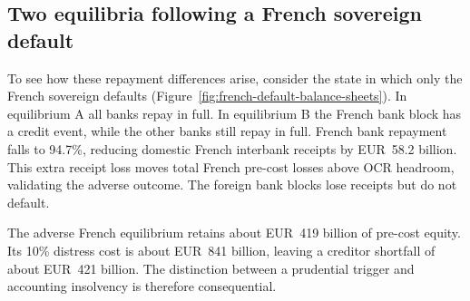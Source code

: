 \documentclass[preprint,12pt,authoryear]{elsarticle}
\begin{document}
\begin{table}[htbp]
\centering
{}
\label{tab:bank-recovery-dispersion}


\par\smallskip

\end{table}

\subsection{Two equilibria following a French sovereign default}

To see how these repayment differences arise, consider the state in which only the French sovereign defaults (Figure~\ref{fig:french-default-balance-sheets}). In equilibrium A all banks repay in full. In equilibrium B the French bank block has a credit event, while the other banks still repay in full. French bank repayment falls to 94.7\%, reducing domestic French interbank receipts by EUR~58.2 billion. This extra receipt loss moves total French pre-cost losses above OCR headroom, validating the adverse outcome. The foreign bank blocks lose receipts but do not default.

The adverse French equilibrium retains about EUR~419 billion of pre-cost equity. Its 10\% distress cost is about EUR~841 billion, leaving a creditor shortfall of about EUR~421 billion. The distinction between a prudential trigger and accounting insolvency is therefore consequential.
\end{document}
